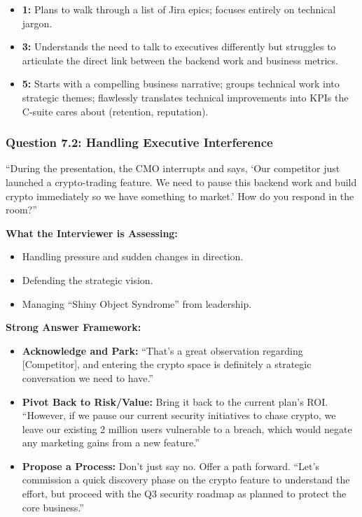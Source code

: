 \documentclass[
  11pt,
  openany,
  oneside]{book}
\providecommand{\tightlist}{%
  \setlength{\itemsep}{0pt}\setlength{\parskip}{0pt}}
\begin{document}
\begin{itemize}
\tightlist
\item
  \textbf{1:} Plans to walk through a list of Jira epics; focuses
  entirely on technical jargon.
\item
  \textbf{3:} Understands the need to talk to executives differently but
  struggles to articulate the direct link between the backend work and
  business metrics.
\item
  \textbf{5:} Starts with a compelling business narrative; groups
  technical work into strategic themes; flawlessly translates technical
  improvements into KPIs the C-suite cares about (retention,
  reputation).
\end{itemize}

\subsubsection{Question 7.2: Handling Executive
Interference}\label{question-7.2-handling-executive-interference}

``During the presentation, the CMO interrupts and says, `Our competitor
just launched a crypto-trading feature. We need to pause this backend
work and build crypto immediately so we have something to market.' How
do you respond in the room?''

\textbf{What the Interviewer is Assessing:}

\begin{itemize}
\tightlist
\item
  Handling pressure and sudden changes in direction.
\item
  Defending the strategic vision.
\item
  Managing ``Shiny Object Syndrome'' from leadership.
\end{itemize}

\textbf{Strong Answer Framework:}

\begin{itemize}
\tightlist
\item
  \textbf{Acknowledge and Park:} ``That's a great observation regarding
  {[}Competitor{]}, and entering the crypto space is definitely a
  strategic conversation we need to have.''
\item
  \textbf{Pivot Back to Risk/Value:} Bring it back to the current plan's
  ROI. ``However, if we pause our current security initiatives to chase
  crypto, we leave our existing 2 million users vulnerable to a breach,
  which would negate any marketing gains from a new feature.''
\item
  \textbf{Propose a Process:} Don't just say no. Offer a path forward.
  ``Let's commission a quick discovery phase on the crypto feature to
  understand the effort, but proceed with the Q3 security roadmap as
  planned to protect the core business.''
\end{itemize}
\end{document}
